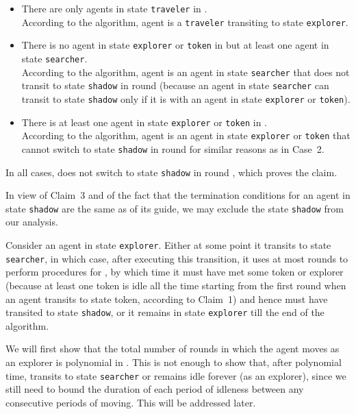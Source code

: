 \documentclass[11pt]{article}
\newcommand{\finclaim}{\hfill }
\newcommand{\qed}{\hfill  \bigbreak}
\newenvironment{proof}{\noindent {\bf Proof.}}{\qed}
\begin{document}
\begin{proof}
\begin{itemize}
\begin{itemize}
\item{  There are only agents in state {\tt traveler} in .\\ According to the algorithm, agent  is a {\tt traveler} transiting to state {\tt explorer}.}

\item{  There is no agent in state {\tt explorer} or {\tt token} in  but at least one agent in state {\tt searcher}.\\ According to the algorithm, agent  is an agent in state {\tt searcher} that does not transit to state {\tt shadow} in round  (because an agent in state {\tt searcher} can transit to state {\tt shadow} only if it is with an agent in state {\tt explorer} or {\tt token}).}

\item{  There is at least one agent in state {\tt explorer} or {\tt token} in .\\ According to the algorithm, agent  is an agent in state {\tt explorer} or {\tt token} that cannot switch to state {\tt shadow} in round  for similar reasons as in Case~2. }

\end{itemize}
 
\end{itemize}

{In all cases,  does not switch to state {\tt shadow} in round , which proves the claim.} \finclaim

{In view of Claim~3 and of the fact that} the termination  conditions for an agent in state 
 {\tt shadow} are the same as of its guide, we may exclude the state {\tt shadow} from our analysis.



Consider an agent in state {\tt explorer}. Either at some point it transits to state {\tt searcher}, in which case, after executing this transition,  it uses at most  rounds to perform procedures 
 for , by which time it must have met some token or explorer {(because at least one token is idle all the time starting from the first round when an agent transits to state token, according to Claim~1)} and hence must have transited to state {\tt shadow},
 or it remains in state {\tt explorer} till the end of the algorithm.
 
{ We will first show that the total number of rounds in which the agent moves as an explorer is polynomial in . This is not enough to show that, after polynomial time,  transits to state {\tt searcher} or remains idle forever (as an explorer), since we still need to bound the duration of each period of idleness
 between any consecutive periods of moving. This will be addressed later.}
 

\end{proof}
\end{document}
